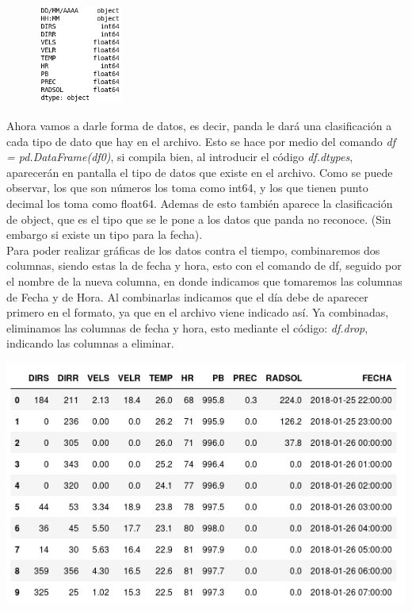 \documentclass[12pt]{article}
\begin{document}
\begin{figure}
    \centering
    \includegraphics[width=0.25\textwidth]{TiposDatos.png}
\end{figure}

Ahora vamos a darle forma de datos, es decir, panda le dará una clasificación a cada tipo de dato que hay en el archivo. Esto se hace por medio del comando \textit{df = pd.DataFrame(df0)}, si compila bien, al introducir el código \textit{df.dtypes}, aparecerán en pantalla el tipo de datos que existe en el archivo. Como se puede observar, los que son números los toma como int64, y los que tienen punto decimal los toma como float64. Ademas de esto también aparece la clasificación de object, que es el tipo que se le pone a los datos que panda no reconoce. (Sin embargo si existe un tipo para la fecha).  \\

Para poder realizar gráficas de los datos contra el tiempo, combinaremos dos columnas, siendo estas la de fecha y hora, esto con el comando de df, seguido por el nombre de la nueva columna, en donde indicamos que tomaremos las columnas de Fecha y de Hora. Al combinarlas indicamos que el día debe de aparecer primero en el formato, ya que en el archivo viene indicado así. Ya combinadas, eliminamos las columnas de fecha y hora, esto mediante el código: \textit{df.drop}, indicando las columnas a eliminar. \\

\begin{center}
\includegraphics[scale=0.7]{NuevaTabla.png}
\end{center}
 
\end{document}
